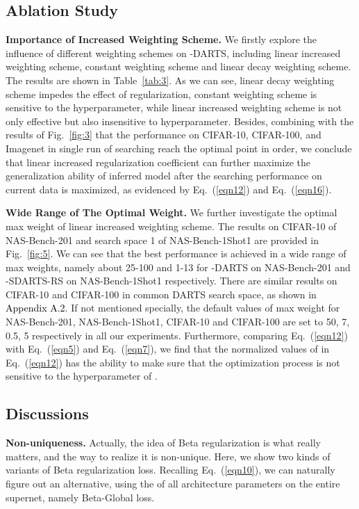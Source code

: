 \documentclass[10pt,twocolumn,letterpaper]{article}
\newcommand{\bp}[1]{\textcolor{black}{#1}}
\begin{document}
\subsection{Ablation Study} 
\noindent\textbf{Importance of Increased Weighting Scheme.} We firstly explore the influence of different weighting schemes on -DARTS, including linear increased weighting scheme, constant weighting scheme and linear decay weighting scheme. The results are shown in Table~\ref{tab:3}. As we can see, linear decay weighting scheme impedes the effect of regularization, constant weighting scheme is sensitive to the hyperparameter, while linear increased weighting scheme is not only effective but also insensitive to hyperparameter. Besides, combining with the results of Fig.~\ref{fig:3} that the performance on CIFAR-10, CIFAR-100, and Imagenet in single run of searching reach the optimal point in order, we conclude that linear increased regularization coefficient can further maximize the generalization ability of inferred model after the searching performance on current data is maximized, as evidenced by Eq.~(\ref{eqn12}) and Eq.~(\ref{eqn16}).

\noindent\textbf{Wide Range of The Optimal Weight.} We further investigate the optimal max weight of linear increased weighting scheme. The results on CIFAR-10 of NAS-Bench-201 and search space 1 of NAS-Bench-1Shot1 are provided in Fig.~\ref{fig:5}. We can see that the best performance is achieved in a wide range of max weights, namely about 25-100 and 1-13 for -DARTS on NAS-Bench-201 and -SDARTS-RS on NAS-Bench-1Shot1 respectively. There are similar results on CIFAR-10 and CIFAR-100 in common DARTS search space, as shown in \bp{Appendix A.2}. If not mentioned specially, the default values of max weight for NAS-Bench-201, NAS-Bench-1Shot1, CIFAR-10 and CIFAR-100 are set to 50, 7, 0.5, 5 respectively in all our experiments. Furthermore, comparing Eq.~(\ref{eqn12}) with Eq.~(\ref{eqn5}) and Eq.~(\ref{eqn7}), we find that the normalized values of  in  Eq.~(\ref{eqn12}) has the ability to make sure that the optimization process is not sensitive to the hyperparameter of .

\subsection{Discussions} 
\noindent\textbf{Non-uniqueness.} Actually, the idea of Beta regularization is what really matters, and the way to realize it is non-unique. Here, we show two kinds of variants of Beta regularization loss. Recalling Eq.~(\ref{eqn10}), we can naturally figure out an alternative, using the  of all architecture parameters on the entire supernet, namely Beta-Global loss.
\end{document}
